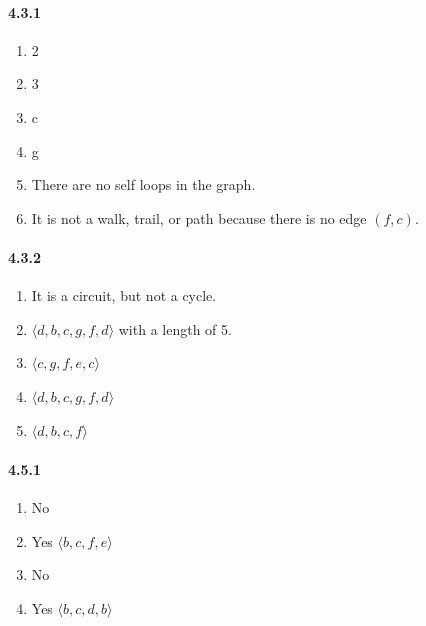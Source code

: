 \documentclass[11pt, letterpaper, twocolumn, fleqn]{article}
\begin{document}
    \paragraph{4.3.1}
        \begin{enumerate}
            \item 2
            \item 3
            \item c
            \item g
            \item There are no self loops in the graph.
            \item It is not a walk, trail, or path because there is no edge $(f,c)$.
        \end{enumerate}
    
    \paragraph{4.3.2}
        \begin{enumerate}
            \item It is a circuit, but not a cycle.
            \item $\langle d,b,c,g,f,d \rangle$ with a length of 5.
            \item $\langle c,g,f,e,c \rangle$
            \item $\langle d,b,c,g,f,d \rangle$
            \item $\langle d,b,c,f \rangle$
        \end{enumerate}
    
    \paragraph{4.5.1}
        \begin{enumerate}
            \item No
            \item Yes $\langle b,c,f,e \rangle$
            \item No
            \addtocounter{enumi}{1}
            \item Yes $\langle b,c,d,b \rangle$
        \end{enumerate}
    
\end{document}
